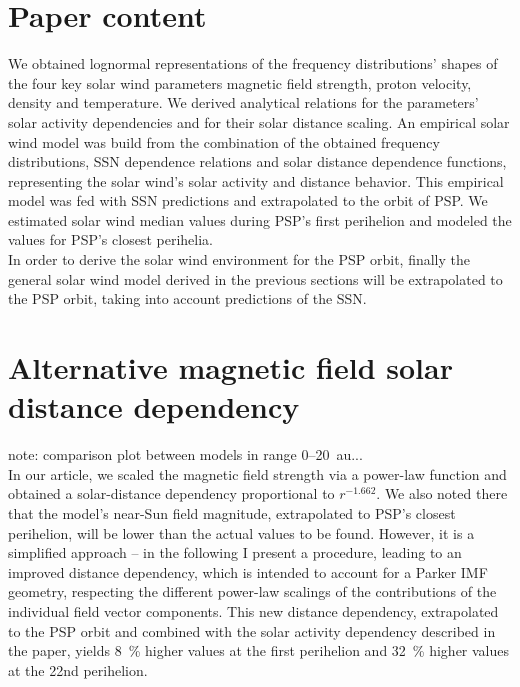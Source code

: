 \section{Paper content}
We obtained lognormal representations of the frequency distributions’ shapes of the four key solar wind parameters magnetic field strength, proton velocity, density and temperature. We derived analytical relations for the parameters’ solar activity dependencies and for their solar distance scaling. An empirical solar wind model was build from the combination of the obtained frequency distributions, SSN dependence relations and solar distance dependence functions, representing the solar wind’s solar activity and distance behavior. This empirical model was fed with SSN predictions and extrapolated to the orbit of PSP. We estimated solar wind median values during PSP’s first perihelion and modeled the values for PSP’s closest perihelia.\\

In order to derive the solar wind environment for the PSP orbit, finally the general solar wind model derived in the previous sections will be extrapolated to the PSP orbit, taking into account predictions of the SSN.\\


\section{Alternative magnetic field solar distance dependency}

note: comparison plot between models in range 0--20~au...\\

In our article, we scaled the magnetic field strength via a power-law function and obtained a solar-distance dependency proportional to $r^{-1.662}$. We also noted there that the model's near-Sun field magnitude, extrapolated to PSP's closest perihelion, will be lower than the actual values to be found. However, it is a simplified approach -- in the following I present a procedure, leading to an improved distance dependency, which is intended to account for a Parker IMF geometry,  respecting the different power-law scalings of the contributions of the individual field vector components. This new distance dependency, extrapolated to the PSP orbit and combined with the solar activity dependency described in the paper, yields \SI{8}{\%} higher values at the first perihelion and \SI{32}{\%} higher values at the 22nd perihelion.\\

